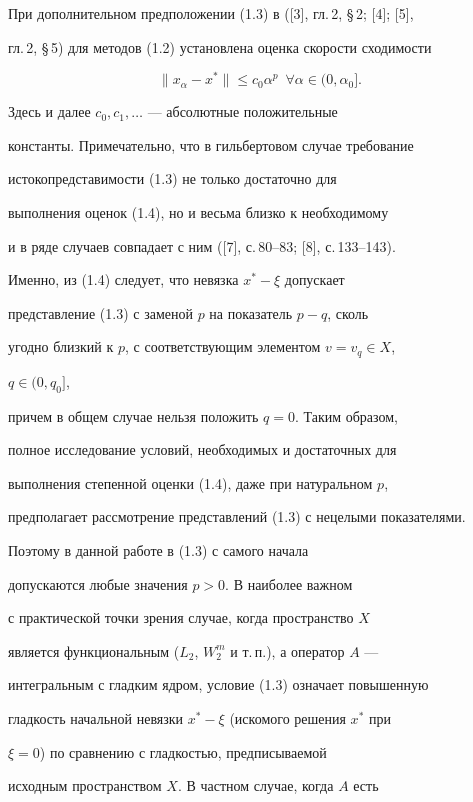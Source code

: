 При дополнительном предположении (1.3) в ([3], гл.\,2, \S\,2; [4]; [5], 


гл.\,2, \S\,5) для методов (1.2) установлена оценка скорости сходимости 


\begin{equation} 


\|x_\alpha-x^*\|\le c_0\alpha^p\ \; \forall\alpha\in(0,\alpha_0]. 


\end{equation} 


Здесь и далее $c_0,c_1,\dotsc$ --- абсолютные положительные 


константы. Примечательно, что в гильбертовом случае требование 


истокопредставимости (1.3) не только достаточно для 


выполнения оценок (1.4), но и весьма близко к необходимому 


и в ряде случаев совпадает с ним ([7], с.\,80--83; [8], с.\,133--143). 


Именно, из (1.4) следует, что невязка $x^*-\xi$ допускает 


представление (1.3) с заменой $p$ на показатель $p-q$, сколь 


угодно близкий к $p$, с соответствующим элементом $v=v_q\in X$, 


$q\in(0,q_0]$, 


причем в общем случае нельзя положить $q=0$. Таким образом, 


полное исследование условий, необходимых и достаточных для 


выполнения степенной оценки (1.4), даже при натуральном $p$, 


предполагает рассмотрение представлений (1.3) с нецелыми показателями. 


Поэтому в данной работе в (1.3) с самого начала 


допускаются любые значения $p>0$. В наиболее важном 


с практической точки зрения случае, когда пространство $X$ 


является функциональным ($L_2$, $W^m_2$ и т.\,п.), а оператор $A$ --- 


интегральным с гладким ядром, условие (1.3) означает повышенную 


гладкость начальной невязки $x^*-\xi$ (искомого решения $x^*$ при 


$\xi=0$) по сравнению с гладкостью, предписываемой 


исходным пространством $X$. В частном случае, когда $A$ есть 


